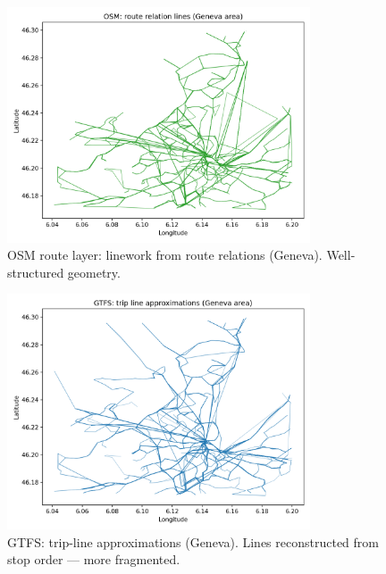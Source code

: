\begin{figure}[H]
  \centering
  \includegraphics[width=0.8\textwidth]{../figures/chap4/geneva_osm_route_lines.png}
  \caption{OSM route layer: linework from route relations (Geneva). Well-structured geometry.}
\end{figure}

\begin{figure}[H]
  \centering
  \includegraphics[width=0.8\textwidth]{../figures/chap4/geneva_gtfs_trip_lines.png}
  \caption{GTFS: trip-line approximations (Geneva). Lines reconstructed from stop order — more fragmented.}
\end{figure}

